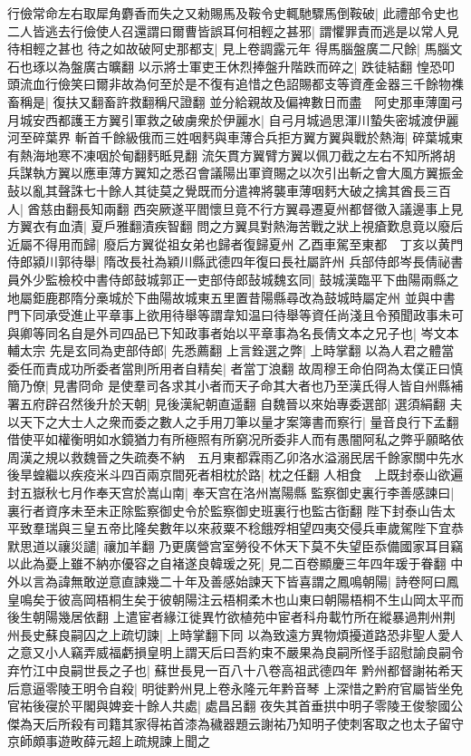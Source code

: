 行儉常命左右取犀角麝香而失之又勑賜馬及鞍令史輒馳驟馬倒鞍破|{
	此禮部令史也}
二人皆逃去行儉使人召還謂曰爾曹皆誤耳何相輕之甚邪|{
	謂懼罪責而逃是以常人見待相輕之甚也}
待之如故破阿史那都支|{
	見上卷調露元年}
得馬腦盤廣二尺餘|{
	馬腦文石也琢以為盤廣古曠翻}
以示將士軍吏王休烈捧盤升階跌而碎之|{
	跌徒結翻}
惶恐叩頭流血行儉笑曰爾非故為何至於是不復有追惜之色詔賜都支等資產金器三千餘物襍畜稱是|{
	復扶又翻畜許救翻稱尺證翻}
並分給親故及偏禆數日而盡　阿史那車薄圍弓月城安西都護王方翼引軍救之破虜衆於伊麗水|{
	自弓月城過思渾川蟄失密城渡伊麗河至碎葉界}
斬首千餘級俄而三姓咽麫與車薄合兵拒方翼方翼與戰於熱海|{
	碎葉城東有熱海地寒不凍咽於甸翻麫眡見翻}
流矢貫方翼臂方翼以佩刀截之左右不知所將胡兵謀執方翼以應車薄方翼知之悉召會議陽出軍資賜之以次引出斬之會大風方翼振金鼔以亂其聲誅七十餘人其徒莫之覺既而分遣禆將襲車薄咽麫大破之擒其酋長三百人|{
	酋慈由翻長知兩翻}
西突厥遂平閻懷旦竟不行方翼尋遷夏州都督徵入議邊事上見方翼衣有血漬|{
	夏戶雅翻漬疾智翻}
問之方翼具對熱海苦戰之狀上視瘡歎息竟以廢后近屬不得用而歸|{
	廢后方翼從祖女弟也歸者復歸夏州}
乙酉車駕至東都　丁亥以黄門侍郎潁川郭待舉|{
	隋改長社為穎川縣武德四年復曰長社屬許州}
兵部侍郎岑長倩祕書員外少監檢校中書侍郎鼓城郭正一吏部侍郎鼔城魏玄同|{
	鼓城漢臨平下曲陽兩縣之地屬鉅鹿郡隋分槀城於下曲陽故城東五里置昔陽縣尋改為鼓城時屬定州}
並與中書門下同承受進止平章事上欲用待舉等謂韋知温曰待舉等資任尚淺且令預聞政事未可與卿等同名自是外司四品已下知政事者始以平章事為名長倩文本之兄子也|{
	岑文本輔太宗}
先是玄同為吏部侍郎|{
	先悉薦翻}
上言銓選之弊|{
	上時掌翻}
以為人君之體當委任而責成功所委者當則所用者自精矣|{
	者當丁浪翻}
故周穆王命伯冏為太僕正曰慎簡乃僚|{
	見書冏命}
是使羣司各求其小者而天子命其大者也乃至漢氏得人皆自州縣補署五府辟召然後升於天朝|{
	見後漢紀朝直遥翻}
自魏晉以來始專委選部|{
	選須絹翻}
夫以天下之大士人之衆而委之數人之手用刀筆以量才案簿書而察行|{
	量音良行下孟翻}
借使平如權衡明如水鏡猶力有所極照有所窮况所委非人而有愚闇阿私之弊乎願略依周漢之規以救魏晉之失疏奏不納　五月東都霖雨乙卯洛水溢溺民居千餘家關中先水後旱蝗繼以疾疫米斗四百兩京間死者相枕於路|{
	枕之任翻}
人相食　上既封泰山欲遍封五嶽秋七月作奉天宫於嵩山南|{
	奉天宫在洛州嵩陽縣}
監察御史裏行李善感諫曰|{
	裏行者資序未至未正除監察御史令於監察御史班裏行也監古衘翻}
陛下封泰山告太平致羣瑞與三皇五帝比隆矣數年以來菽粟不稔餓殍相望四夷交侵兵車歲駕陛下宜恭默思道以禳災譴|{
	禳加羊翻}
乃更廣營宫室勞役不休天下莫不失望臣忝備國家耳目竊以此為憂上雖不納亦優容之自褚遂良韓瑗之死|{
	見二百卷顯慶三年四年瑗于眷翻}
中外以言為諱無敢逆意直諫幾二十年及善感始諫天下皆喜謂之鳳鳴朝陽|{
	詩卷阿曰鳳皇鳴矣于彼高岡梧桐生矣于彼朝陽注云梧桐柔木也山東曰朝陽梧桐不生山岡太平而後生朝陽幾居依翻}
上遣宦者緣江徙異竹欲植苑中宦者科舟載竹所在縱暴過荆州荆州長史蘇良嗣囚之上疏切諫|{
	上時掌翻下同}
以為致遠方異物煩擾道路恐非聖人愛人之意又小人竊弄威福虧損皇明上謂天后曰吾約束不嚴果為良嗣所怪手詔慰諭良嗣令弃竹江中良嗣世長之子也|{
	蘇世長見一百八十八卷高祖武德四年}
黔州都督謝祐希天后意逼零陵王明令自殺|{
	明徙黔州見上卷永隆元年黔音琴}
上深惜之黔府官屬皆坐免官祐後寑於平閣與婢妾十餘人共處|{
	處昌呂翻}
夜失其首垂拱中明子零陵王俊黎國公傑為天后所殺有司籍其家得祐首漆為穢器題云謝祐乃知明子使刺客取之也太子留守京師頗事遊畋薛元超上疏規諫上聞之

